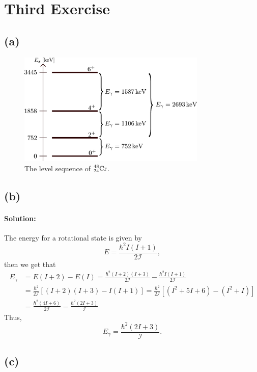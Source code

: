 \section{Third Exercise}
\subsection*{(a)}
\begin{figure}[h]
	\centering
	\includegraphics[width=0.8\textwidth]{./figures/level_sequence.pdf}
	\caption{The level sequence of $\nuc{Cr}{48}{24}$.}
	\label{fig:levels}
\end{figure}

\subsection*{(b)}
\paragraph{Solution:} The energy for a rotational state is given by
\begin{equation}
	E = \frac{\hbar^2 I (I+1)}{2 \mathcal{I}},
\end{equation}
then we get that
\begin{align}
	E_\gamma &= E(I+2) - E(I) = \frac{\hbar^2 (I + 2)(I+3)}{2 \mathcal{I}} - \frac{\hbar^2 I(I+1)}{2 \mathcal{I}}\\
	&= \frac{\hbar^2}{2 \mathcal{I}}[(I+2)(I+3) - I(I+1)] = \frac{\hbar^2}{2 \mathcal{I}} [(I^2 + 5I + 6)- (I^2 + I)]\\ 
	&= \frac{\hbar^2(4I + 6)}{2 \mathcal{I}} = \frac{\hbar^2(2I + 3)}{ \mathcal{I}}
\end{align}
Thus,
\begin{equation}
	E_\gamma = \frac{\hbar^2(2I + 3)}{ \mathcal{I}}. \label{eq:EI}
\end{equation}

\subsection*{(c)}
